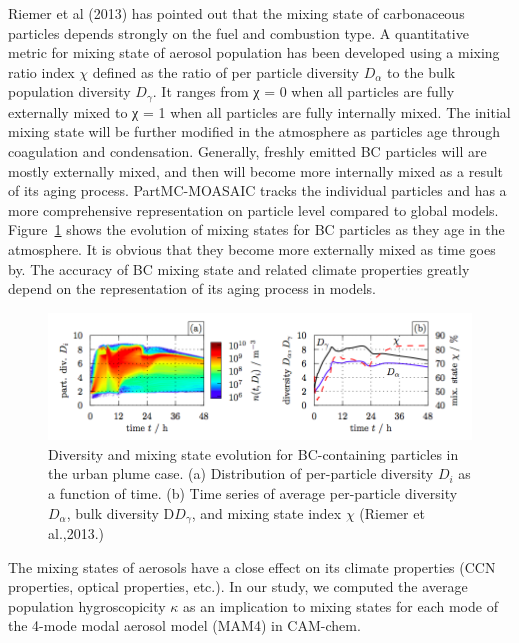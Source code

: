 \documentclass[12pt]{article}
\begin{document}
		\newpage
		Riemer et al (2013) has pointed out that the mixing state of carbonaceous particles depends strongly on the fuel and combustion type. A quantitative metric for mixing state of aerosol population has been developed using a mixing ratio index $\chi$ defined as the ratio of per particle diversity $D_{\alpha}$ to the bulk population diversity $D_{\gamma}$. It ranges from χ = 0 when all particles are fully externally mixed to χ = 1 when all particles are fully internally mixed. The initial mixing state will be further modified in the atmosphere as particles age through coagulation and condensation. Generally, freshly emitted BC particles will are mostly externally mixed, and then will become more internally mixed as a result of its aging process. PartMC-MOASAIC tracks the individual particles and has a more comprehensive representation on particle level compared to global models. Figure~\ref{fig_P6} shows the evolution of mixing states for BC particles as they age in the atmosphere. It is obvious that they become more externally mixed as time goes by. The accuracy of BC mixing state and related climate properties greatly depend on the representation of its aging process in models.
	
	\begin{figure}[H] 
		\begin{center}
			\includegraphics[width = 1\textwidth]{Figure06}
			\caption[]{\label{fig_P6} Diversity and mixing state evolution for BC-containing particles in the urban plume case. (a) Distribution of per-particle diversity $D_{i}$ as a function of time. (b) Time series of average per-particle diversity $D_{\alpha}$, bulk diversity D$D_{\gamma}$, and mixing state index $\chi$ (Riemer et al.,2013.)}
		\end{center}
	\end{figure}
	
		 The mixing states of aerosols have a close effect on its climate properties (CCN properties, optical properties, etc.). In our study, we computed the average population hygroscopicity $\kappa$ as an implication to mixing states for each mode of the 4-mode modal aerosol model (MAM4) in CAM-chem. 
	  
\end{document}
